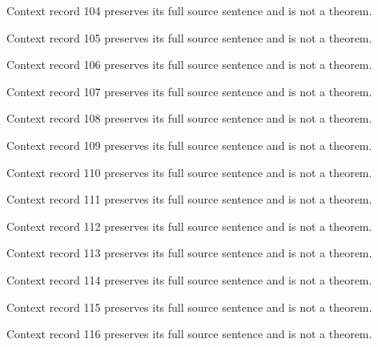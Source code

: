 \documentclass{article}
\begin{document}
\begin{remark}\label{train:context:104}Context record 104 preserves its full source sentence and is not a theorem.\end{remark}
\begin{remark}\label{train:context:105}Context record 105 preserves its full source sentence and is not a theorem.\end{remark}
\begin{remark}\label{train:context:106}Context record 106 preserves its full source sentence and is not a theorem.\end{remark}
\begin{remark}\label{train:context:107}Context record 107 preserves its full source sentence and is not a theorem.\end{remark}
\begin{remark}\label{train:context:108}Context record 108 preserves its full source sentence and is not a theorem.\end{remark}
\begin{remark}\label{train:context:109}Context record 109 preserves its full source sentence and is not a theorem.\end{remark}
\begin{remark}\label{train:context:110}Context record 110 preserves its full source sentence and is not a theorem.\end{remark}
\begin{remark}\label{train:context:111}Context record 111 preserves its full source sentence and is not a theorem.\end{remark}
\begin{remark}\label{train:context:112}Context record 112 preserves its full source sentence and is not a theorem.\end{remark}
\begin{remark}\label{train:context:113}Context record 113 preserves its full source sentence and is not a theorem.\end{remark}
\begin{remark}\label{train:context:114}Context record 114 preserves its full source sentence and is not a theorem.\end{remark}
\begin{remark}\label{train:context:115}Context record 115 preserves its full source sentence and is not a theorem.\end{remark}
\begin{remark}\label{train:context:116}Context record 116 preserves its full source sentence and is not a theorem.\end{remark}
\end{document}
